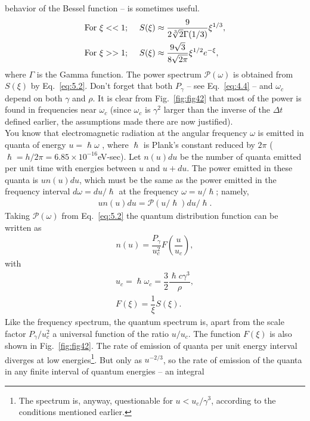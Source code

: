 behavior of the Bessel function -- is sometimes useful.
\begin{align} \label{eq:5.6}
	\text{For }\xi << 1; \hspace{5mm} & S(\xi) \approx \dfrac{9}{2\sqrt[3]{2}\Gamma(1/3)} \xi^{1/3}, \\
    \text{For }\xi >> 1; \hspace{5mm} & S(\xi) \approx \dfrac{9\sqrt{3}}{8 \sqrt{2\pi}} \xi^{1/2} e^{-\xi},
\end{align}
 where $\Gamma$ is the Gamma function. The power spectrum $\mathscr{P}(\omega)$ is obtained from $S(\xi)$ by Eq.~\eqref{eq:5.2}. Don't forget that both $P_\gamma$ -- see Eq.~\eqref{eq:4.4} -- and $\omega_c$ depend on both $\gamma$ and $\rho$. It is clear from Fig.~\ref{fig:fig42} that most of the power is found in frequencies near $\omega_c$ (since $\omega_c$ is $\gamma^2$ larger
 than the inverse of the $\Delta t$ defined earlier, the assumptions made there are now justified).\\
You know that electromagnetic radiation at the angular frequency $\omega$ is emitted in quanta of energy $u = \hslash \omega$ , where $\hslash$ is Plank's constant reduced by $2\pi$ ($\hslash = h/2\pi = 6.85 \times 10^{-16}$eV-sec). Let $n(u)du$ be the number of quanta emitted per unit time with energies between $u$ and $u + du$. The power emitted in these quanta is $un(u)du$,
which must be the same as the power emitted in the frequency interval $d\omega = du/\hslash$
at the frequency $\omega = u/\hslash$; namely,
\begin{align}
	u n(u) du = \mathscr{P}(u/\hslash)du/\hslash.
\end{align}
Taking $\mathscr{P}(\omega)$ from Eq.~\eqref{eq:5.2} the quantum distribution function can be written as
\begin{align}
	n(u) = \dfrac{P_\gamma}{u_c^2} F\left( \dfrac{u}{u_c} \right),
\end{align}
with
\begin{align} \label{eq:5.9}
	u_c = \hslash \omega_c = \dfrac{3}{2} \dfrac{\hslash c \gamma^3}{\rho},\\
    F(\xi) = \dfrac{1}{\xi}S(\xi).
\end{align}
Like the frequency spectrum, the quantum spectrum is, apart from the scale factor $P_\gamma/u_c^2$ a universal function of the ratio $u/u_c$.
The function $F(\xi)$ is also shown in Fig.~\ref{fig:fig42}. The rate of emission of quanta per unit energy interval diverges at low energies\footnote{The spectrum is, anyway, questionable for $u < u_c/\gamma^3$, according to the conditions mentioned earlier.}. But only as $u^{-2/3}$, so the rate of emission of the quanta in any finite interval of quantum energies -- an integral
